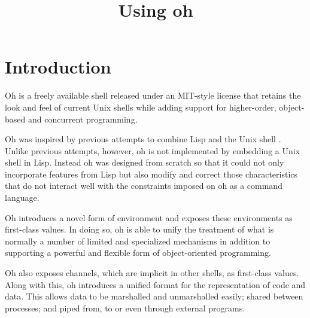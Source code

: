 \documentclass[12pt]{book}
\begin{document}
\title{\LARGE \bf Using oh}
\author{}
\date{}

\maketitle

\chapter{Introduction}
Oh is a freely available shell released under an MIT-style license that
retains the look and feel of current Unix shells while adding support for
higher-order, object-based and concurrent programming.

Oh was inspired by previous attempts to combine Lisp and the Unix shell
\cite{ALispShell, scsh}. Unlike previous attempts, however, oh is not
implemented by embedding a Unix shell in Lisp. Instead oh was designed
from scratch so that it could not only incorporate features from Lisp but
also modify and correct those characteristics that do not interact well
with the constraints imposed on oh as a command language.

Oh introduces a novel form of environment and exposes these environments
as first-class values. In doing so, oh is able to unify the treatment of
what is normally a number of limited and specialized mechanisms in addition
to supporting a powerful and flexible form of object-oriented programming.

Oh also exposes channels, which are implicit in other shells, as first-class
values. Along with this, oh introduces a unified format for the
representation of code and data. This allows data to be marshalled and
unmarshalled easily; shared between processes; and piped from, to or even
through external programs.



\end{document}
